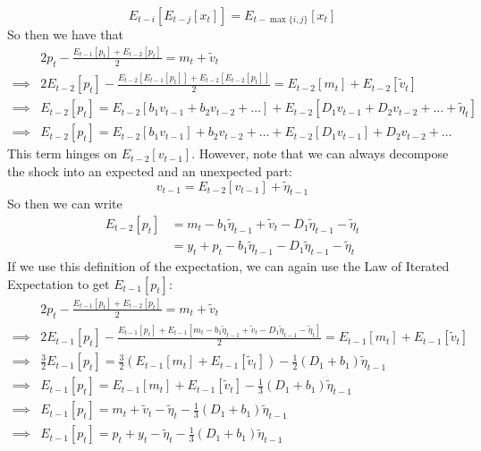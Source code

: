 \documentclass[12pt]{article}
\begin{document}
\begin{itemize}
\begin{equation}
        E_{t-i}[E_{t-j}[x_t]] = E_{t-\max\{i,j\}}[x_t]
    \end{equation}
    So then we have that
    \[\begin{split}
        &2p_t - \frac{E_{t-1}[p_t] + E_{t-2}[p_t]}{2} = m_t + \widetilde{v}_t \\
        \implies &2E_{t-2}[p_t] - \frac{E_{t-2}[E_{t-1}[p_t]] + E_{t-2}[E_{t-2}[p_t]]}{2} = E_{t-2}[m_t] + E_{t-2}[\widetilde{v}_t] \\
        \implies &E_{t-2}[p_t] = E_{t-2}[b_1v_{t-1} + b_2v_{t-2} + \hdots] + E_{t-2}[D_1v_{t-1} + D_2v_{t-2} + \hdots + \widetilde{\eta}_t] \\
        \implies &E_{t-2}[p_t] = E_{t-2}[b_1v_{t-1}] + b_2v_{t-2} + \hdots + E_{t-2}[D_1v_{t-1}] + D_2v_{t-2} + \hdots
    \end{split}\]
    This term hinges on $E_{t-2}[v_{t-1}]$. However, note that we can always decompose the shock into an expected and an unexpected part:
    \[v_{t-1} = E_{t-2}[v_{t-1}] + \widetilde{\eta}_{t-1}\]
    So then we can write
    \[\begin{split}
        E_{t-2}[p_t] &= m_t - b_1\widetilde{\eta}_{t-1} + \widetilde{v}_t -D_1\widetilde{\eta}_{t-1} - \widetilde{\eta}_t \\
        &= y_t + p_t - b_1\widetilde{\eta}_{t-1}-D_1\widetilde{\eta}_{t-1} - \widetilde{\eta}_t
    \end{split}\]
    If we use this definition of the expectation, we can again use the Law of Iterated Expectation to get $E_{t-1}[p_t]$:
    \[\begin{split}
        &2p_t - \frac{E_{t-1}[p_t] + E_{t-2}[p_t]}{2} = m_t + \widetilde{v}_t \\
        \implies &2E_{t-1}[p_t] - \frac{E_{t-1}[p_t] + E_{t-1}[m_t - b_1\widetilde{\eta}_{t-1} + \widetilde{v}_t -D_1\widetilde{\eta}_{t-1} - \widetilde{\eta}_t]}{2} = E_{t-1}[m_t] + E_{t-1}[\widetilde{v}_t] \\
        \implies &\frac{3}{2}E_{t-1}[p_t] = \frac{3}{2}(E_{t-1}[m_t] + E_{t-1}[\widetilde{v}_t]) - \frac{1}{2}(D_1+b_1)\widetilde{\eta}_{t-1} \\
        \implies &E_{t-1}[p_t] = E_{t-1}[m_t] + E_{t-1}[\widetilde{v}_t] - \frac{1}{3}(D_1+b_1)\widetilde{\eta}_{t-1} \\
        \implies &E_{t-1}[p_t] = m_t  + \widetilde{v}_t - \widetilde{\eta}_t - \frac{1}{3}(D_1+b_1)\widetilde{\eta}_{t-1} \\
        \implies &E_{t-1}[p_t] = p_t + y_t - \widetilde{\eta}_t - \frac{1}{3}(D_1+b_1)\widetilde{\eta}_{t-1}

\end{split}\]
\end{itemize}
\end{document}
